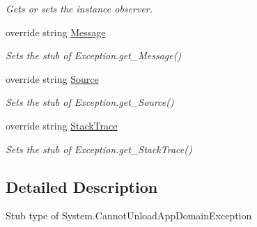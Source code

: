 \begin{DoxyCompactItemize}
\begin{DoxyCompactList}\small\item\em Gets or sets the instance observer.\end{DoxyCompactList}\item 
override string \hyperlink{class_system_1_1_fakes_1_1_stub_cannot_unload_app_domain_exception_a47ca558d7a0f3cb175179167edaaaaee}{Message}
\begin{DoxyCompactList}\small\item\em Sets the stub of Exception.\-get\-\_\-\-Message()\end{DoxyCompactList}\item 
override string \hyperlink{class_system_1_1_fakes_1_1_stub_cannot_unload_app_domain_exception_a63302ba312f46f1caa8a38bc32900112}{Source}
\begin{DoxyCompactList}\small\item\em Sets the stub of Exception.\-get\-\_\-\-Source()\end{DoxyCompactList}\item 
override string \hyperlink{class_system_1_1_fakes_1_1_stub_cannot_unload_app_domain_exception_a34538ac1b0cb31e6137da428478badcb}{Stack\-Trace}
\begin{DoxyCompactList}\small\item\em Sets the stub of Exception.\-get\-\_\-\-Stack\-Trace()\end{DoxyCompactList}\end{DoxyCompactItemize}


\subsection{Detailed Description}
Stub type of System.\-Cannot\-Unload\-App\-Domain\-Exception



